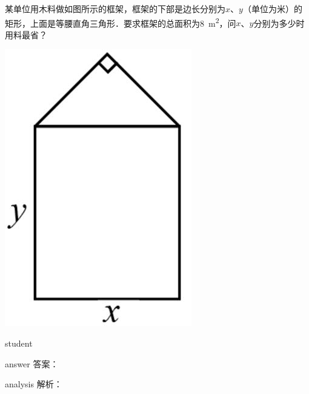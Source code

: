 \begin{example}
	某单位用木料做如图所示的框架，框架的下部是边长分别为$ x $、$ y $（单位为米）的矩形，上面是等腰直角三角形．要求框架的总面积为\SI{8}{m^2}，问$ x $、$ y $分别为多少时用料最省？
		\begin{flushright}
			\includegraphics[width=0.2\linewidth]{image/kinamatics-8.png}
		\end{flushright}
	
	\begin{taggedblock}{student}
		\vspace*{0cm}
	\end{taggedblock}
	
	
	\begin{taggedblock}{answer}
		答案：
	\end{taggedblock}
	
	
	\begin{taggedblock}{analysis}
		解析：
	\end{taggedblock}
\end{example}